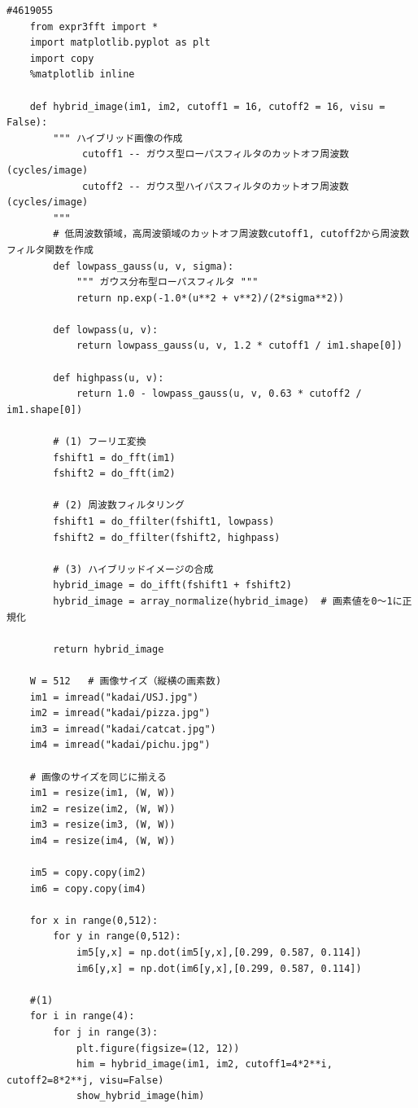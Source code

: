 \documentclass[12pt]{jarticle}
\begin{document}
\begin{lstlisting}[style = py,caption=kadai1]
    #4619055
    from expr3fft import *
    import matplotlib.pyplot as plt
    import copy
    %matplotlib inline
    
    def hybrid_image(im1, im2, cutoff1 = 16, cutoff2 = 16, visu = False):
        """ ハイブリッド画像の作成 
             cutoff1 -- ガウス型ローパスフィルタのカットオフ周波数(cycles/image)
             cutoff2 -- ガウス型ハイパスフィルタのカットオフ周波数(cycles/image)
        """
        # 低周波数領域，高周波領域のカットオフ周波数cutoff1, cutoff2から周波数フィルタ関数を作成
        def lowpass_gauss(u, v, sigma):
            """ ガウス分布型ローパスフィルタ """
            return np.exp(-1.0*(u**2 + v**2)/(2*sigma**2))
    
        def lowpass(u, v): 
            return lowpass_gauss(u, v, 1.2 * cutoff1 / im1.shape[0])
    
        def highpass(u, v): 
            return 1.0 - lowpass_gauss(u, v, 0.63 * cutoff2 / im1.shape[0])
        
        # (1) フーリエ変換
        fshift1 = do_fft(im1)
        fshift2 = do_fft(im2)
        
        # (2) 周波数フィルタリング
        fshift1 = do_ffilter(fshift1, lowpass)
        fshift2 = do_ffilter(fshift2, highpass)
        
        # (3) ハイブリッドイメージの合成
        hybrid_image = do_ifft(fshift1 + fshift2) 
        hybrid_image = array_normalize(hybrid_image)  # 画素値を0～1に正規化
        
        return hybrid_image
    
    W = 512   # 画像サイズ（縦横の画素数)
    im1 = imread("kadai/USJ.jpg")
    im2 = imread("kadai/pizza.jpg")
    im3 = imread("kadai/catcat.jpg")
    im4 = imread("kadai/pichu.jpg")
    
    # 画像のサイズを同じに揃える
    im1 = resize(im1, (W, W))
    im2 = resize(im2, (W, W))
    im3 = resize(im3, (W, W))
    im4 = resize(im4, (W, W))
    
    im5 = copy.copy(im2)
    im6 = copy.copy(im4)
    
    for x in range(0,512):
        for y in range(0,512):
            im5[y,x] = np.dot(im5[y,x],[0.299, 0.587, 0.114])
            im6[y,x] = np.dot(im6[y,x],[0.299, 0.587, 0.114])
    
    #(1)
    for i in range(4):
        for j in range(3):
            plt.figure(figsize=(12, 12))
            him = hybrid_image(im1, im2, cutoff1=4*2**i, cutoff2=8*2**j, visu=False)
            show_hybrid_image(him)
            

\end{lstlisting}
\end{document}
